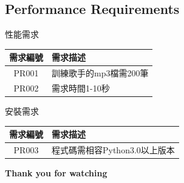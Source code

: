 \documentclass{article}
\begin{document}
\begin{CJK}{UTF8}{bkai}
\subsection{ \Large Performance Requirements}
\begin{center}
	性能需求\\
	\begin{tabular}{|c|p{8cm}|}\hline
		需求編號 & 需求描述 \\ \hline
		PR001 & 訓練歌手的mp3檔需200筆  \\ \hline
		PR002 & 需求時間1-10秒  \\ \hline
	\end{tabular}
\end{center}
\begin{center}
	安裝需求\\
	\begin{tabular}{|c|p{8cm}|}\hline
		需求編號 &  需求描述 \\ \hline
		PR003 & 程式碼需相容Python3.0以上版本  \\ \hline

	\end{tabular}
\end{center}
\newpage
\Huge\bf   Thank you for watching


\end{CJK}
\end{document}
